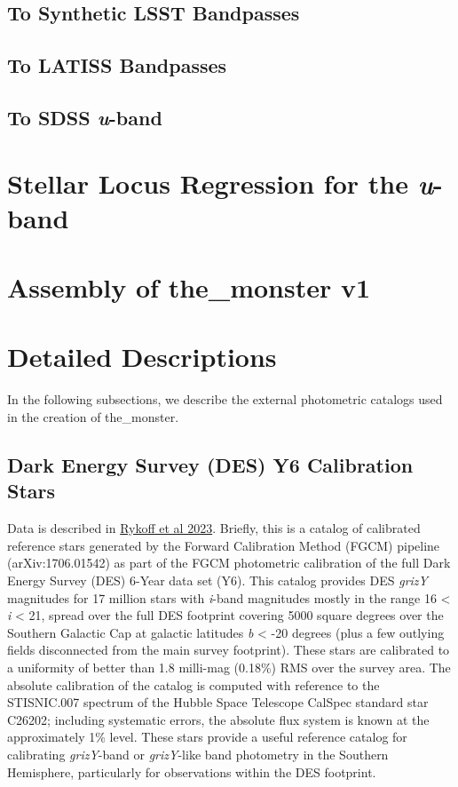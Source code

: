 \subsection{To Synthetic LSST Bandpasses}
\subsection{To LATISS Bandpasses}
\subsection{To SDSS \textit{u}-band}

\section{Stellar Locus Regression for the \textit{u}-band}
\label{sec:slr}

\section{Assembly of the\_monster v1}
\label{sec:assembly}



\section{Detailed Descriptions}
\label{sec:details}
In the following subsections, we describe the external photometric catalogs used in the creation of the\_monster.

\subsection{Dark Energy Survey (DES) Y6 Calibration Stars}
\label{sec:des}
Data is described in \href{https://arxiv.org/abs/2305.01695}{Rykoff et al 2023}. Briefly, this is a catalog of calibrated reference stars generated by the Forward Calibration Method (FGCM) pipeline (arXiv:1706.01542) as part of the FGCM photometric calibration of the full Dark Energy Survey (DES) 6-Year data set (Y6). This catalog provides DES \textit{grizY} magnitudes for 17 million stars with \textit{i}-band magnitudes mostly in the range 16 < \textit{i} < 21, spread over the full DES footprint covering 5000 square degrees over the Southern Galactic Cap at galactic latitudes \textit{b} < -20 degrees (plus a few outlying fields disconnected from the main survey footprint). These stars are calibrated to a uniformity of better than 1.8 milli-mag (0.18\%) RMS over the survey area. The absolute calibration of the catalog is computed with reference to the STISNIC.007 spectrum of the Hubble Space Telescope CalSpec standard star C26202; including systematic errors, the absolute flux system is known at the approximately 1\% level. These stars provide a useful reference catalog for calibrating \textit{grizY}-band or \textit{grizY}-like band photometry in the Southern Hemisphere, particularly for observations within the DES footprint.

